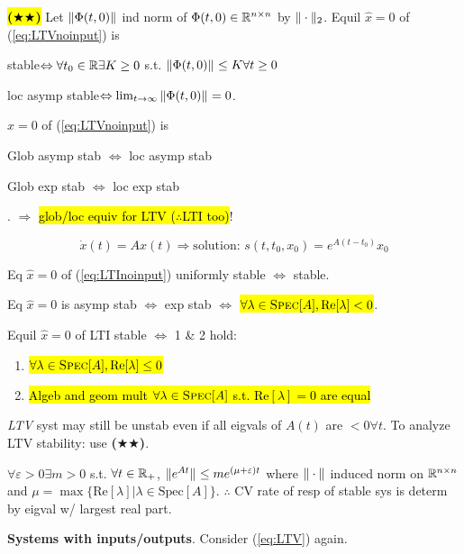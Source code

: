 \begin{Theorem}
\hl{{\color{blue}\textbf{($\bigstar\bigstar$)}}} Let $\|\Phi(t,0)\|_{}$ ind norm of $\Phi(t,0)\in\mathbb R^{n\times n}$ by $\|\cdot\|_{2}$. Equil $\hat x=0$ of (\ref{eq:LTVnoinput}) is
\begin{itemize*}
  \item stable$\Leftrightarrow\forall t_0\in\mathbb R\exists K\ge 0$ s.t. $\|\Phi(t,0)\|_{}\le K\forall t\ge 0$
  \item loc asymp stable$\Leftrightarrow \lim_{t\to\infty}\|\Phi(t,0)\|_{}=0$.
\end{itemize*}
\end{Theorem}
\begin{Fact}
$\hat x=0$ of (\ref{eq:LTVnoinput}) is 
\begin{itemize*}
  \item Glob asymp stab $\Leftrightarrow$ loc asymp stab
  \item Glob exp stab $\Leftrightarrow$ loc exp stab
\end{itemize*}. $\Rightarrow$ \hl{glob/loc equiv for LTV ($\therefore$LTI too)}!
\end{Fact}
\vspace{-2.5mm}
\begin{equation}\label{eq:LTInoinput}
\dot x(t)=Ax(t) \Rightarrow\text{solution: }s(t,t_0,x_0)=e^{A(t-t_0)}x_0
\end{equation}

\begin{Theorem}
Eq $\hat x=0$ of (\ref{eq:LTInoinput}) uniformly stable $\Leftrightarrow$ stable.

Eq $\widehat x=0$ is asymp stab $\Leftrightarrow$ exp stab $\Leftrightarrow$ \hl{$\forall\lambda\in\textsc{Spec}[A],\text{Re}[\lambda]<0$}.

Equil $\hat x=0$ of LTI stable $\Leftrightarrow$ 1 \& 2 hold:
\begin{enumerate}[leftmargin=4mm]
  \item \hl{$\forall\lambda\in\textsc{Spec}[A],\text{Re}[\lambda]\le 0$}
  \item \hl{Algeb and geom mult $\forall\lambda\in\textsc{Spec}[A]$ s.t. $\text{Re}[\lambda]=0$ are equal}
\end{enumerate}
\end{Theorem}
\textit{LTV} syst may still be unstab even if all eigvals of $A(t)$ are $<0\forall t$. To analyze LTV stability: use {\color{blue}\textbf{($\bigstar\bigstar$)}}.
\begin{Fact}
$\forall\varepsilon>0\exists m>0$ s.t. $\forall t\in\mathbb R_+$, $\|e^{At}\|_{}\le me^{(\mu+\varepsilon)t}$
where $\|\cdot\|_{}$ induced norm on $\mathbb R^{n\times n}$ and $\mu=\max\{\text{Re}[\lambda] | \lambda\in\text{Spec}[A]\}$. $\therefore$ CV rate of resp of stable sys is determ by eigval w/ largest real part.
\end{Fact}
\textbf{Systems with inputs/outputs}. Consider (\ref{eq:LTV}) again.

